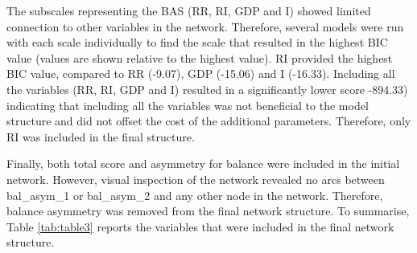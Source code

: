 \documentclass[
  english,
  man]{apa6}
\begin{document}
The subscales representing the BAS (RR, RI, GDP and I) showed limited connection to other variables in the network.
Therefore, several models were run with each scale individually to find the scale that resulted in the highest BIC value (values are shown relative to the highest value).
RI provided the highest BIC value, compared to RR (-9.07), GDP (-15.06) and I (-16.33).
Including all the variables (RR, RI, GDP and I) resulted in a significantly lower score -894.33) indicating that including all the variables was not beneficial to the model structure and did not offset the cost of the additional parameters. Therefore, only RI was included in the final structure.

Finally, both total score and asymmetry for balance were included in the initial network. However, visual inspection of the network revealed no arcs between bal\_asym\_1 or bal\_asym\_2 and any other node in the network.
Therefore, balance asymmetry was removed from the final network structure.
To summarise, Table \ref{tab:table3} reports the variables that were included in the final network structure.
\end{document}

